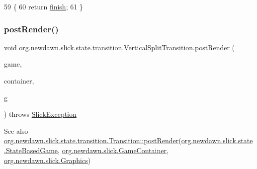 \begin{DoxyCode}
59                                 \{
60         \textcolor{keywordflow}{return} \mbox{\hyperlink{classorg_1_1newdawn_1_1slick_1_1state_1_1transition_1_1_vertical_split_transition_ade40e19759a22b7b524807868c8992a4}{finish}};
61     \}
\end{DoxyCode}
\mbox{\label{classorg_1_1newdawn_1_1slick_1_1state_1_1transition_1_1_vertical_split_transition_a54a4f79a015e46a983ff7172be755eb9}} 
\subsubsection{\texorpdfstring{post\+Render()}{postRender()}}
{\footnotesize\ttfamily void org.\+newdawn.\+slick.\+state.\+transition.\+Vertical\+Split\+Transition.\+post\+Render (\begin{DoxyParamCaption}\item[{\mbox{\hyperlink{classorg_1_1newdawn_1_1slick_1_1state_1_1_state_based_game}{State\+Based\+Game}}}]{game,  }\item[{\mbox{\hyperlink{classorg_1_1newdawn_1_1slick_1_1_game_container}{Game\+Container}}}]{container,  }\item[{\mbox{\hyperlink{classorg_1_1newdawn_1_1slick_1_1_graphics}{Graphics}}}]{g }\end{DoxyParamCaption}) throws \mbox{\hyperlink{classorg_1_1newdawn_1_1slick_1_1_slick_exception}{Slick\+Exception}}\hspace{0.3cm}{\ttfamily [inline]}}

\begin{DoxySeeAlso}{See also}
\mbox{\hyperlink{interfaceorg_1_1newdawn_1_1slick_1_1state_1_1transition_1_1_transition_ac113f4d5a19962a62a8adec7f9ab5d47}{org.\+newdawn.\+slick.\+state.\+transition.\+Transition\+::post\+Render}}(\mbox{\hyperlink{classorg_1_1newdawn_1_1slick_1_1state_1_1_state_based_game}{org.\+newdawn.\+slick.\+state.\+State\+Based\+Game}}, \mbox{\hyperlink{classorg_1_1newdawn_1_1slick_1_1_game_container}{org.\+newdawn.\+slick.\+Game\+Container}}, \mbox{\hyperlink{classorg_1_1newdawn_1_1slick_1_1_graphics}{org.\+newdawn.\+slick.\+Graphics}}) 
\end{DoxySeeAlso}



